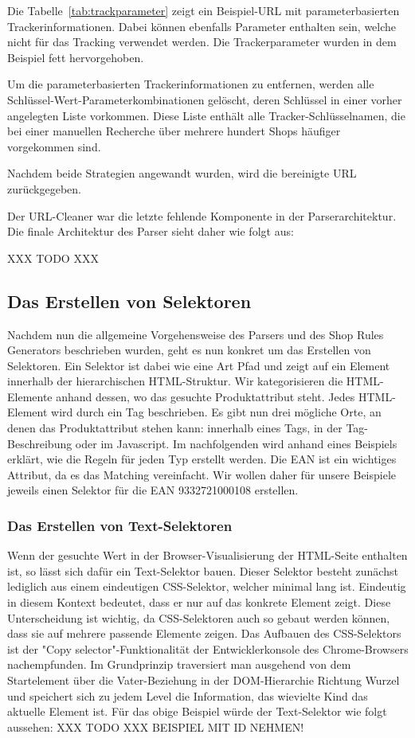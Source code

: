 Die Tabelle~\ref{tab:trackparameter} zeigt ein Beispiel-URL mit parameterbasierten Trackerinformationen.
Dabei können ebenfalls Parameter enthalten sein, welche nicht für das Tracking verwendet werden.
Die Trackerparameter wurden in dem Beispiel fett hervorgehoben.

Um die parameterbasierten Trackerinformationen zu entfernen, werden alle Schlüssel-Wert-Parameterkombinationen
gelöscht, deren Schlüssel in einer vorher angelegten Liste vorkommen.
Diese Liste enthält alle Tracker-Schlüsselnamen, die bei einer manuellen Recherche über mehrere hundert Shops
häufiger vorgekommen sind.

Nachdem beide Strategien angewandt wurden, wird die bereinigte URL zurückgegeben.

Der URL-Cleaner war die letzte fehlende Komponente in der Parserarchitektur.
Die finale Architektur des Parser sieht daher wie folgt aus:

XXX TODO XXX

\subsection{Das Erstellen von Selektoren}
\label{subsec:erstellen-von-selektoren}

Nachdem nun die allgemeine Vorgehensweise des Parsers und des Shop Rules Generators beschrieben wurden, geht es nun
konkret um das Erstellen von Selektoren.
Ein Selektor ist dabei wie eine Art Pfad und zeigt auf ein Element innerhalb der hierarchischen HTML-Struktur.
Wir kategorisieren die HTML-Elemente anhand dessen, wo das gesuchte Produktattribut steht.
Jedes HTML-Element wird durch ein Tag beschrieben.
Es gibt nun drei mögliche Orte, an denen das Produktattribut stehen kann: innerhalb eines Tags, in der Tag-Beschreibung
oder im Javascript.
Im nachfolgenden wird anhand eines Beispiels erklärt, wie die Regeln für jeden Typ erstellt werden.
Die EAN ist ein wichtiges Attribut, da es das Matching vereinfacht.
Wir wollen daher für unsere Beispiele jeweils einen Selektor für die EAN 9332721000108 erstellen.

\subsubsection{Das Erstellen von Text-Selektoren}
\label{subsubsec:erstellen-von-text-selektoren}

Wenn der gesuchte Wert in der Browser-Visualisierung der HTML-Seite enthalten ist, so lässt sich dafür ein
Text-Selektor bauen.
Dieser Selektor besteht zunächst lediglich aus einem eindeutigen CSS-Selektor, welcher minimal lang ist.
Eindeutig in diesem Kontext bedeutet, dass er nur auf das konkrete Element zeigt.
Diese Unterscheidung ist wichtig, da CSS-Selektoren auch so gebaut werden können, dass sie auf mehrere passende
Elemente zeigen.
Das Aufbauen des CSS-Selektors ist der "Copy selector"-Funktionalität der Entwicklerkonsole des Chrome-Browsers
nachempfunden.
Im Grundprinzip traversiert man ausgehend von dem Startelement über die Vater-Beziehung in der
DOM-Hierarchie Richtung Wurzel und speichert sich zu jedem Level die Information, das wievielte Kind das aktuelle
Element ist.
Für das obige Beispiel würde der Text-Selektor wie folgt aussehen: XXX TODO XXX BEISPIEL MIT ID NEHMEN!

